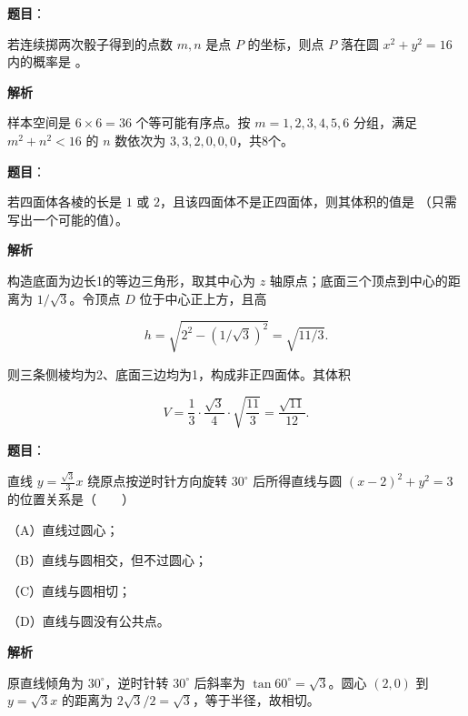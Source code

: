 \begin{answer}

\textbf{题目}：

若连续掷两次骰子得到的点数 $m,n$ 是点 $P$ 的坐标，则点 $P$ 落在圆 $x^2+y^2=16$ 内的概率是 \gkblank{}。

\textbf{解析}

样本空间是 $6\times6=36$ 个等可能有序点。按 $m=1,2,3,4,5,6$ 分组，满足 $m^2+n^2<16$ 的 $n$ 数依次为 $3,3,2,0,0,0$，共8个。


\end{answer}
\begin{answer}

\textbf{题目}：

若四面体各棱的长是 $1$ 或 $2$，且该四面体不是正四面体，则其体积的值是 \gkblank{}（只需写出一个可能的值）。

\textbf{解析}

构造底面为边长1的等边三角形，取其中心为 $z$ 轴原点；底面三个顶点到中心的距离为 $1/\sqrt3$。令顶点 $D$ 位于中心正上方，且高

\nopagebreak[4]
\[
h=\sqrt{2^2-(1/\sqrt3)^2}=\sqrt{11/3}.
\]

则三条侧棱均为2、底面三边均为1，构成非正四面体。其体积

\nopagebreak[4]
\[
V=\frac13\cdot\frac{\sqrt3}{4}\cdot\sqrt{\frac{11}{3}}=\frac{\sqrt{11}}{12}.
\]


\end{answer}
\begin{answer}

\textbf{题目}：

直线 $y=\frac{\sqrt3}{3}x$ 绕原点按逆时针方向旋转 $30^\circ$ 后所得直线与圆 $(x-2)^2+y^2=3$ 的位置关系是\mbox{（　　）}

（A）直线过圆心；

（B）直线与圆相交，但不过圆心；

（C）直线与圆相切；

（D）直线与圆没有公共点。

\textbf{解析}

原直线倾角为 $30^\circ$，逆时针转 $30^\circ$ 后斜率为 $\tan60^\circ=\sqrt3$。圆心 $(2,0)$ 到 $y=\sqrt3x$ 的距离为 $2\sqrt3/2=\sqrt3$，等于半径，故相切。


\end{answer}
